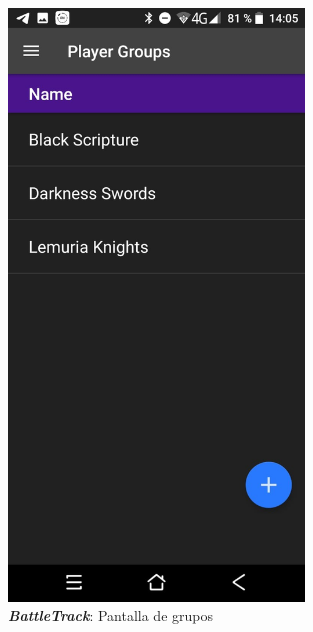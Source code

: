 \begin{figure}[H]
    \centering
    \begin{minipage}{0.3\textwidth}
        \centering
        \includegraphics[width=0.7\textwidth]{Images/BattleTrack_1.jpeg}
        \caption{\textit{\textbf{BattleTrack}}: Pantalla de grupos }
        \label{BattleTrack1}   
        

\end{minipage}
\end{figure}
